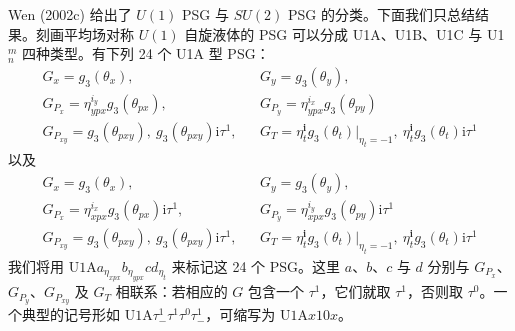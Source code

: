Wen (2002c) 给出了 $U(1)$ PSG 与 $SU(2)$ PSG 的分类。下面我们只总结结果。刻画平均场对称 $U(1)$ 自旋液体的 PSG 可以分成 U1A、U1B、U1C 与 U1$_{n}^{m}$ 四种类型。有下列 24 个 U1A 型 PSG：
\begin{equation*}
\begin{array}{rcl}
G_{x}=g_{3}(\theta_{x}), & & G_{y}=g_{3}(\theta_{y}),\\[2pt]
G_{P_{x}}=\eta_{ypx}^{i_{y}}g_{3}(\theta_{px}), & & G_{P_{y}}=\eta_{ypx}^{i_{x}}g_{3}(\theta_{py})\\[2pt]
G_{P_{xy}}=g_{3}(\theta_{pxy}),\ g_{3}(\theta_{pxy})\mathrm{i}\tau^{1}, & & G_{T}=\eta_{t}^{\pmb{i}}g_{3}(\theta_{t})\big|_{\eta_{t}=-1},\ \eta_{t}^{\pmb{i}}g_{3}(\theta_{t})\mathrm{i}\tau^{1}
\end{array}
\tag{9.4.21}
\end{equation*}
以及
\begin{equation*}
\begin{array}{rcl}
G_{x}=g_{3}(\theta_{x}), & & G_{y}=g_{3}(\theta_{y}),\\[2pt]
G_{P_{x}}=\eta_{xpx}^{i_{x}}g_{3}(\theta_{px})\mathrm{i}\tau^{1}, & & G_{P_{y}}=\eta_{xpx}^{i_{y}}g_{3}(\theta_{py})\mathrm{i}\tau^{1}\\[2pt]
G_{P_{xy}}=g_{3}(\theta_{pxy}),\ g_{3}(\theta_{pxy})\mathrm{i}\tau^{1}, & & G_{T}=\eta_{t}^{\pmb{i}}g_{3}(\theta_{t})\big|_{\eta_{t}=-1},\ \eta_{t}^{\pmb{i}}g_{3}(\theta_{t})\mathrm{i}\tau^{1}
\end{array}
\tag{9.4.22}
\end{equation*}
我们将用 $\text{U1A}a_{\eta_{xpx}}b_{\eta_{ypx}}cd_{\eta_{t}}$ 来标记这 24 个 PSG。这里 $a$、$b$、$c$ 与 $d$ 分别与 $G_{P_{x}}$、$G_{P_{y}}$、$G_{P_{xy}}$ 及 $G_{T}$ 相联系：若相应的 $G$ 包含一个 $\tau^{1}$，它们就取 $\tau^{1}$，否则取 $\tau^{0}$。一个典型的记号形如 $\text{U1A}\tau_{-}^{1}\tau^{1}\tau^{0}\tau_{-}^{1}$，可缩写为 $\text{U1A}x10x$。

